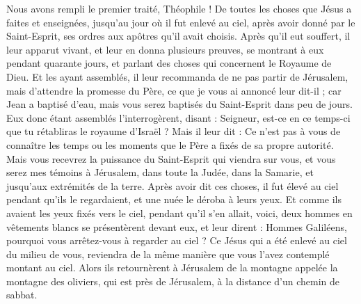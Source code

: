 \begin{multicols}{2}
\VerseOne{}Nous avons rempli le premier traité, Théophile ! De toutes les choses que Jésus a faites et enseignées,
jusqu'au jour où il fut enlevé au ciel, après avoir donné par le Saint-Esprit, ses ordres aux apôtres qu'il avait choisis.
Après qu’il eut souffert, il leur apparut vivant, et leur en donna plusieurs preuves, se montrant à eux pendant quarante jours, et parlant des choses qui concernent le Royaume de Dieu.
Et les ayant assemblés, il leur recommanda de ne pas partir de Jérusalem, mais d’attendre la promesse du Père, ce que je vous ai annoncé leur dit-il ;
car Jean a baptisé d'eau, mais vous serez baptisés du Saint-Esprit dans peu de jours.
Eux donc étant assemblés l'interrogèrent, disant : Seigneur, est-ce en ce temps-ci que tu rétabliras le royaume d'Israël ?
Mais il leur dit : Ce n'est pas à vous de connaître les temps ou les moments que le Père a fixés de sa propre autorité.
Mais vous recevrez la puissance du Saint-Esprit qui viendra sur vous, et vous serez mes témoins à Jérusalem, dans toute la Judée, dans la Samarie, et jusqu'aux extrémités de la terre.
Après avoir dit ces choses, il fut élevé au ciel pendant qu’ils le regardaient, et une nuée le déroba à leurs yeux.
Et comme ils avaient les yeux fixés vers le ciel, pendant qu’il s’en allait, voici, deux hommes en vêtements blancs se présentèrent devant eux,
et leur dirent : Hommes Galiléens, pourquoi vous arrêtez-vous à regarder au ciel ? Ce Jésus qui a été enlevé au ciel du milieu de vous, reviendra de la même manière que vous l'avez contemplé montant au ciel.
Alors ils retournèrent à Jérusalem de la montagne appelée la montagne des oliviers, qui est près de Jérusalem, à la distance d’un chemin de sabbat.

\end{multicols}
